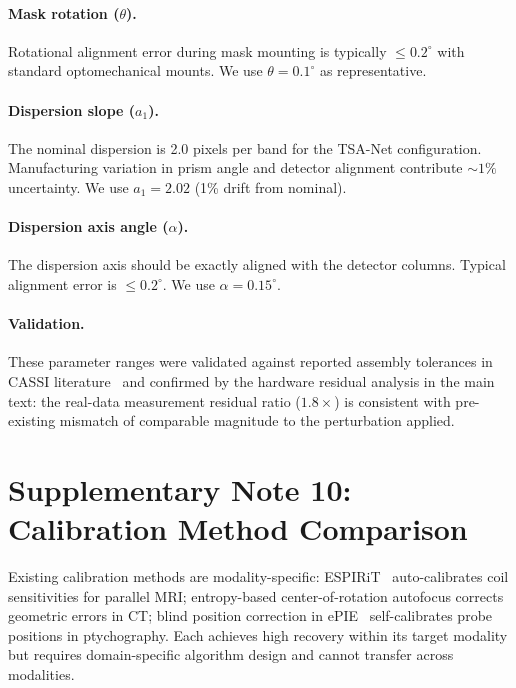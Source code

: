 \documentclass[11pt]{article}
\theoremstyle{definition}
\begin{document}
\paragraph{Mask rotation ($\theta$).}
Rotational alignment error during mask mounting is typically
$\leq 0.2^\circ$ with standard optomechanical mounts.  We use
$\theta = 0.1^\circ$ as representative.

\paragraph{Dispersion slope ($a_1$).}
The nominal dispersion is 2.0 pixels per band for the TSA-Net
configuration.  Manufacturing variation in prism angle and detector
alignment contribute $\sim 1\%$ uncertainty.  We use $a_1 = 2.02$
(1\% drift from nominal).

\paragraph{Dispersion axis angle ($\alpha$).}
The dispersion axis should be exactly aligned with the detector columns.
Typical alignment error is $\leq 0.2^\circ$.  We use
$\alpha = 0.15^\circ$.

\paragraph{Validation.}
These parameter ranges were validated against reported assembly
tolerances in CASSI literature~\cite{wagadarikar2008cassi} and confirmed
by the hardware residual analysis in the main text: the real-data
measurement residual ratio ($1.8\times$) is consistent with pre-existing
mismatch of comparable magnitude to the perturbation applied.


\newpage
\section{Supplementary Note 10: Calibration Method Comparison}
\label{sec:calibration_comparison}

Existing calibration methods are modality-specific: ESPIRiT~\cite{uecker2014espirit} auto-calibrates coil sensitivities for parallel MRI; entropy-based center-of-rotation autofocus corrects geometric errors in CT; blind position correction in ePIE~\cite{maiden2009ptychography} self-calibrates probe positions in ptychography. Each achieves high recovery within its target modality but requires domain-specific algorithm design and cannot transfer across modalities.
\end{document}
